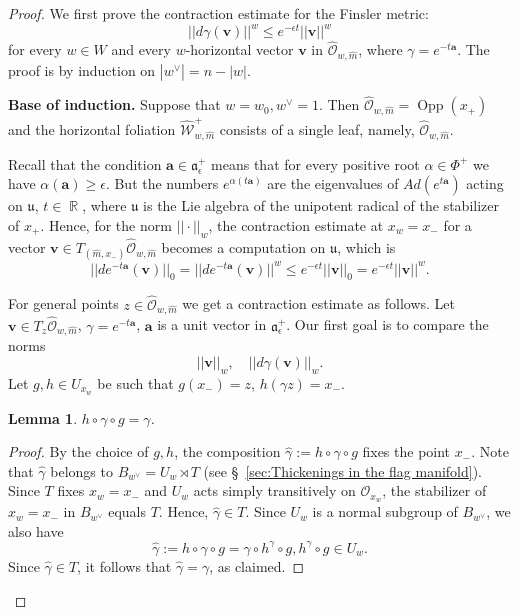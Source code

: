 \documentclass[12pt]{amsbook}%
\newtheorem{lem}[thm]{Lemma}
\theoremstyle{definition}
\theoremstyle{remark}
\numberwithin{section}{chapter}
\numberwithin{subsection}{section}
\numberwithin{figure}{chapter}
\DeclareMathOperator{\Opp}{Opp}
\DeclareMathOperator{\R}{\mathbb{R}}
\def\eps{\epsilon}
\def\cO{{\mathscr{O}}}
\def\cW{{\mathscr{W}}}
\def\ba{\mathbf{a}}
\def\bv{\mathbf{v}}
\def\ga{\gamma}
\def\al{\alpha}
\begin{document}
{{\begin{proof}
\medskip 

We first prove the contraction estimate for the Finsler metric:
\begin{equation}\label{eq:contract} 
 ||d\ga (\bv)||^w\leqslant  e^{-\eps t} ||\bv||^w 
\end{equation}
for every $w\in W$ and every $w$-horizontal vector $\bv$ in $\hat{\cO}_{w,\hat{m}}$, where $\gamma = e^{-t \ba}$. 
The proof is by induction on $|w^\vee|=n-|w|$. 

\medskip 
{\bf Base of induction.} Suppose that $w=w_0, w^\vee=1$. Then $\hat{\cO}_{w,\hat{m}}=\Opp(x_+)$ and the horizontal foliation $ \hat{\cW}_{w,\hat{m}}^+$ consists of a single leaf, namely, $\hat{\cO}_{w,\hat{m}}$. 

 
 Recall that the condition $\ba\in \mathfrak{a}^+_{\eps}$ means that for every positive root $\al\in \Phi^+$ we have
 $\al(\ba)\geqslant \eps$. But the numbers  $e^{\al(t\ba)}$ are the eigenvalues of $Ad(e^{t\ba})$ acting on ${\mathfrak u}$, $t\in \R$, where ${\mathfrak u}$ is the Lie algebra of the unipotent radical of the stabilizer of $x_+$.  Hence, for the norm $||\cdot||_w$, the contraction estimate at $x_w=x_-$ for a vector $\bv \in T_{(\hat{m}, x_-)} \hat{\cO}_{w, \hat{m}}$ becomes a computation on ${\mathfrak u}$, which is 
 $$
||de^{-t\ba}(\bv)||_0= ||de^{-t\ba}(\bv)||^w \leqslant e^{-\eps t} ||\bv||_0= e^{-\eps t} ||\bv||^w. 
 $$
 
For general points $z\in \hat{\cO}_{w, \hat{m}}$ we get a contraction estimate as 
follows. Let $\bv\in T_z \hat{\cO}_{w, \hat{m}}$, $\ga=e^{-t\ba}$, $\ba$ is a unit vector in $\mathfrak{a}_\eps^+$. Our first goal is to compare the norms 
$$
||\bv||_w, \quad ||d\ga (\bv)||_w. 
$$
Let $g, h\in U_{x_w}$ be such that $g(x_-)=z$, $h(\ga z)=x_-$. 

\begin{lem}
 $h\circ \ga \circ g=\ga$. 
\end{lem} 
\begin{proof} By the choice of $g, h$, the composition $\hat\ga:=h\circ \ga \circ g$ fixes the point $x_-$. Note that $\hat\ga$ belongs to 
$B_{w^\vee}= U_w\rtimes T$ (see \S~\ref{sec:Thickenings in the flag manifold}). Since $T$ fixes $x_w=x_-$ and $U_w$ acts simply transitively on $\cO_{x_w}$, the stabilizer of $x_w=x_-$ in 
$B_{w^\vee}$ equals $T$. Hence, $\hat\ga\in T$. Since $U_w$ is a normal subgroup of $B_{w^\vee}$, we also have 
$$
\hat\ga:=h\circ \ga \circ g= \ga \circ h^\ga \circ g, h^\ga \circ g\in U_w. 
$$
Since $\hat\ga\in T$, it follows that $\hat\ga=\ga$, as claimed. 
\end{proof}



\end{proof}}}
\end{document}
